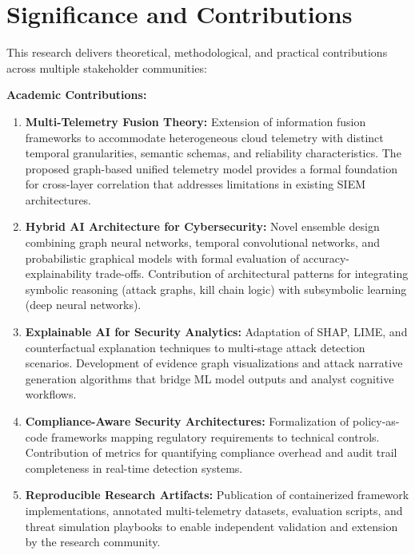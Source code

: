 \section{Significance and Contributions}\label{sec:intro-significance}
This research delivers theoretical, methodological, and practical contributions across multiple stakeholder communities:

\textbf{Academic Contributions:}
\begin{enumerate}
    \item \textbf{Multi-Telemetry Fusion Theory:} Extension of information fusion frameworks to accommodate heterogeneous cloud telemetry with distinct temporal granularities, semantic schemas, and reliability characteristics. The proposed graph-based unified telemetry model provides a formal foundation for cross-layer correlation that addresses limitations in existing SIEM architectures.
    \item \textbf{Hybrid AI Architecture for Cybersecurity:} Novel ensemble design combining graph neural networks, temporal convolutional networks, and probabilistic graphical models with formal evaluation of accuracy-explainability trade-offs. Contribution of architectural patterns for integrating symbolic reasoning (attack graphs, kill chain logic) with subsymbolic learning (deep neural networks).
    \item \textbf{Explainable AI for Security Analytics:} Adaptation of SHAP, LIME, and counterfactual explanation techniques to multi-stage attack detection scenarios. Development of evidence graph visualizations and attack narrative generation algorithms that bridge ML model outputs and analyst cognitive workflows.
    \item \textbf{Compliance-Aware Security Architectures:} Formalization of policy-as-code frameworks mapping regulatory requirements to technical controls. Contribution of metrics for quantifying compliance overhead and audit trail completeness in real-time detection systems.
    \item \textbf{Reproducible Research Artifacts:} Publication of containerized framework implementations, annotated multi-telemetry datasets, evaluation scripts, and threat simulation playbooks to enable independent validation and extension by the research community.
\end{enumerate}

